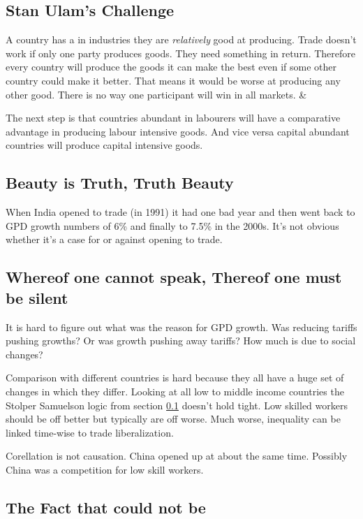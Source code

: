 \documentclass[a4paper, twocolumn]{article}
\newcommand{\keyword}[1]{\textbf{\color{black}{#1}}}
\begin{document}
\subsection{Stan Ulam's Challenge}\label{stolper-samuelson}
A country has a \keyword{Comparative Advantage} in industries they are \emph{relatively} good at producing. Trade doesn't work if only one party produces goods. They need something in return. Therefore every country will produce the goods it can make the best even if some other country could make it better. That means it would be worse at producing any other good. There is no way one participant will win in all markets. \cite{papers-samuelson} \& \cite{political-economy}

The next step is that countries abundant in labourers will have a comparative advantage in producing labour intensive goods. And vice versa capital abundant countries will produce capital intensive goods.\cite{protection-wages}

\subsection{Beauty is Truth, Truth Beauty}
When India opened to trade (in 1991) it had one bad year and then went back to GPD growth numbers of 6\% and finally to 7.5\% in the 2000s. It's not obvious whether it's a case for or against opening to trade.

\subsection{Whereof one cannot speak, Thereof one must be silent}
It is hard to figure out what was the reason for GPD growth. Was reducing tariffs pushing growths? Or was growth pushing away tariffs? How much is due to social changes?

Comparison with different countries is hard because they all have a huge set of changes in which they differ. Looking at all low to middle income countries the Stolper Samuelson logic from section \ref{stolper-samuelson} doesn't hold tight. Low skilled workers should be off better but typically are off worse. Much worse, inequality can be linked time-wise to trade liberalization.

Corellation is not causation. China opened up at about the same time. Possibly China was a competition for low skill workers.

\subsection{The Fact that could not be}
\end{document}
